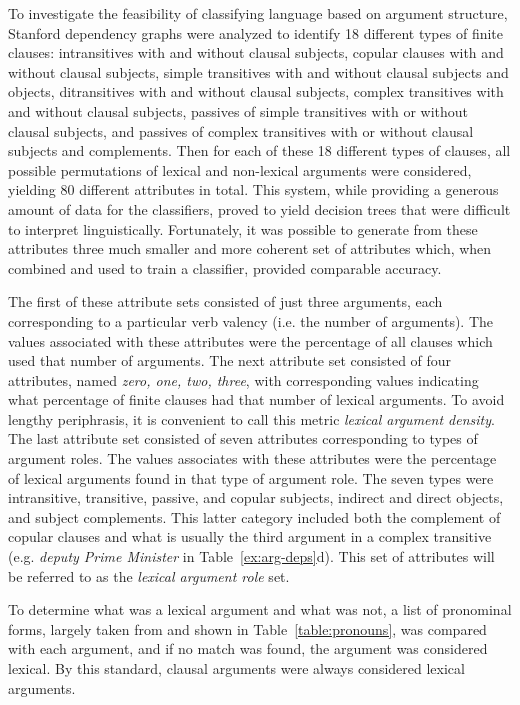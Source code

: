 \documentclass[main.tex]{subfiles}
\begin{document}
To investigate the feasibility of classifying language based on argument structure, Stanford dependency graphs were analyzed to identify 18 different types of finite clauses: intransitives with and without clausal subjects, copular clauses with and without clausal subjects, simple transitives with and without clausal subjects and objects, ditransitives with and without clausal subjects, complex transitives with and without clausal subjects, passives of simple transitives with or without clausal subjects, and passives of complex transitives with or without clausal subjects and complements. Then for each of these 18 different types of clauses, all possible permutations of lexical and non-lexical arguments were considered, yielding 80 different attributes in total. This system, while providing a generous amount of data for the classifiers, proved to yield decision trees that were difficult to interpret linguistically. Fortunately, it was possible to generate from these attributes three much smaller and more coherent set of attributes which, when combined and used to train a classifier, provided comparable accuracy.

The first of these attribute sets consisted of just three arguments, each corresponding to a particular verb valency (i.e. the number of arguments). The values associated with these attributes were the percentage of all clauses which used that number of arguments. The next attribute set consisted of four attributes, named \textit{zero, one, two, three}, with corresponding values indicating what percentage of finite clauses had that number of lexical arguments. To avoid lengthy periphrasis, it is convenient to call this metric \textit{lexical argument density}.  The last attribute set consisted of seven attributes corresponding to types of argument roles. The values associates with these attributes were the percentage of lexical arguments found in that type of argument role. The seven types were intransitive, transitive, passive, and copular subjects, indirect and direct objects, and subject complements. This latter category included both the complement of copular clauses and what is usually the third argument in a complex transitive (e.g. \textit{deputy Prime Minister} in Table~\ref{ex:arg-deps}d). This set of attributes will be referred to as the \textit{lexical argument role} set.

To determine what was a lexical argument and what was not, a list of pronominal forms, largely taken from \citet[Ch. 16]{celce-murcia:1999} and shown in Table~\ref{table:pronouns}, was compared with each argument, and if no match was found, the argument was considered lexical. By this standard, clausal arguments were always considered lexical arguments. 
\end{document}
